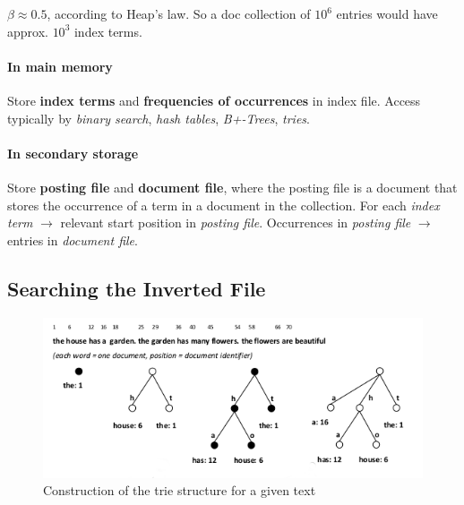 $\beta \approx 0.5$, according to Heap's law. So a doc collection of $10^6$ entries would have approx. $10^3$ index terms.

\paragraph{In main memory} Store \textbf{index terms} and \textbf{frequencies of occurrences} in index file. Access typically by \emph{binary search}, \emph{hash tables}, \emph{B+-Trees}, \emph{tries}.
\paragraph{In secondary storage} Store \textbf{posting file} and \textbf{document file}, where the posting file is a document that stores the occurrence of a term in a document in the collection. For each \emph{index term} $\longrightarrow$ relevant start position in \emph{posting file}. Occurrences in \emph{posting file} $\longrightarrow$ entries in \emph{document file}.

\subsection{Searching the Inverted File}

\begin{figure}
  \centering
  \includegraphics[width=\linewidth]{figures/trie_vocabulary.png}
  \caption{Construction of the trie structure for a given text}
  \label{fig:trie_vocabulary}
\end{figure}

